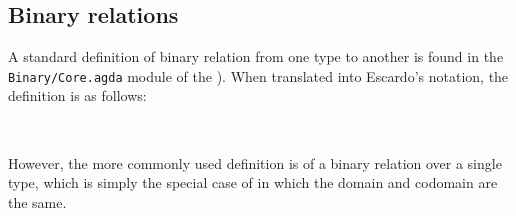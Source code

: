 \documentclass[a4paper,USenglish,cleveref,autoref,thm-restate]{lipics-v2019}
\begin{document}
\subsection{Binary relations}\label{sec:binary-relations-kernels}
A standard definition of binary relation from one type to another is found in the \texttt{Binary/Core.agda} module of the \agdastdlib). When translated into Escardo's notation, the definition is as follows:
\begin{code}%
\>[0]\AgdaSpace{}%
\AgdaSymbol{:}\AgdaSpace{}%
\AgdaSpace{}%
\AgdaSpace{}%
\AgdaSpace{}%
\AgdaSpace{}%
\AgdaSpace{}%
\AgdaSpace{}%
\AgdaSymbol{(}\AgdaSpace{}%
\AgdaSymbol{:}\AgdaSpace{}%
\AgdaSymbol{)}\AgdaSpace{}%
\AgdaSpace{}%
\AgdaSymbol{(}\AgdaSpace{}%
\AgdaSpace{}%
\AgdaSpace{}%
\AgdaSpace{}%
\AgdaSpace{}%
\AgdaSymbol{)}\AgdaSpace{}%
\<%
\\
\>[0]\AgdaSpace{}%
\AgdaSpace{}%
\AgdaSpace{}%
\AgdaSpace{}%
\AgdaSymbol{=}\AgdaSpace{}%
\AgdaSpace{}%
\AgdaSpace{}%
\AgdaSpace{}%
\AgdaSpace{}%
\AgdaSpace{}%
\<%
\end{code}
However, the more commonly used definition is of a binary relation over a single type, which is simply the special case of  in which the domain and codomain are the same.
\begin{code}%
\>[0]\AgdaSpace{}%
\AgdaSymbol{:}\AgdaSpace{}%
\AgdaSpace{}%
\AgdaSpace{}%
\AgdaSpace{}%
\AgdaSymbol{(}\AgdaSpace{}%
\AgdaSymbol{:}\AgdaSpace{}%
\AgdaSymbol{)}\AgdaSpace{}%
\AgdaSpace{}%
\AgdaSpace{}%
\AgdaSpace{}%
\AgdaSpace{}%
\AgdaSpace{}%
\<%
\\
\>[0]\AgdaSpace{}%
\AgdaSpace{}%
\AgdaSpace{}%
\AgdaSymbol{=}\AgdaSpace{}%
\AgdaSpace{}%
\AgdaSpace{}%
\AgdaSpace{}%
\<%
\end{code}
\end{document}
